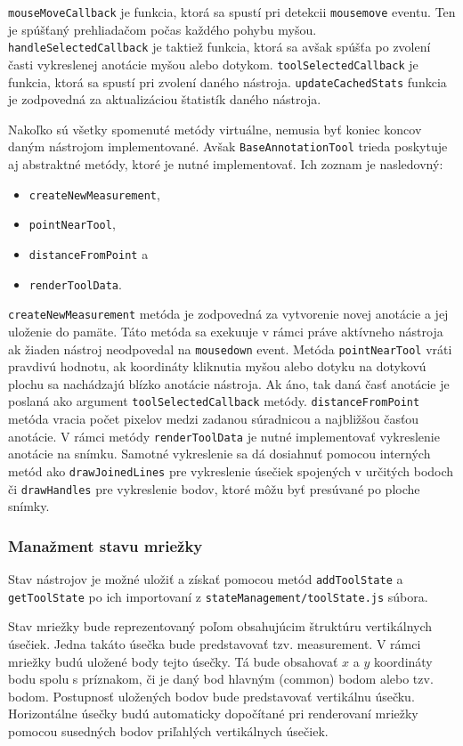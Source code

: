 \texttt{mouseMoveCallback} je funkcia, ktorá sa spustí pri detekcii \texttt{mousemove} eventu. Ten je spúšťaný prehliadačom počas každého pohybu myšou.
\texttt{handleSelectedCallback} je taktiež funkcia, ktorá sa avšak spúšťa po zvolení časti vykreslenej anotácie myšou alebo dotykom.
\texttt{toolSelectedCallback} je funkcia, ktorá sa spustí pri zvolení daného nástroja.
\texttt{updateCachedStats} funkcia je zodpovedná za aktualizáciou štatistík daného nástroja.

Nakoľko sú všetky spomenuté metódy virtuálne, nemusia byť koniec koncov daným nástrojom implementované.
Avšak \texttt{BaseAnnotationTool} trieda poskytuje aj abstraktné metódy, ktoré je nutné implementovať. Ich zoznam je nasledovný:
\begin {itemize}
\item {\texttt{createNewMeasurement},}
\item {\texttt{pointNearTool},}
\item {\texttt{distanceFromPoint} a}
\item {\texttt{renderToolData}.}
\end {itemize}

\texttt{createNewMeasurement} metóda je zodpovedná za vytvorenie novej anotácie a jej uloženie do pamäte. Táto metóda sa exekuuje v rámci práve aktívneho nástroja ak žiaden nástroj neodpovedal na \texttt{mousedown} event.
Metóda \texttt{pointNearTool} vráti pravdivú hodnotu, ak koordináty kliknutia myšou alebo dotyku na dotykovú plochu sa nachádzajú blízko anotácie nástroja. Ak áno, tak daná časť anotácie je poslaná ako argument \texttt{toolSelectedCallback} metódy.
\texttt{distanceFromPoint} metóda vracia počet pixelov medzi zadanou súradnicou a najbližšou časťou anotácie.
V rámci metódy \texttt{renderToolData} je nutné implementovať vykreslenie anotácie na snímku. Samotné vykreslenie sa dá dosiahnuť pomocou interných metód ako \texttt{drawJoinedLines} pre vykreslenie úsečiek spojených v určitých bodoch či \texttt{drawHandles} pre vykreslenie bodov, ktoré môžu byť presúvané po ploche snímky.

\subsubsection {Manažment stavu mriežky}
Stav nástrojov je možné uložiť a získať pomocou metód \texttt{addToolState} a \texttt{getToolState} po ich importovaní z \texttt{stateManagement/toolState.js} súbora.

Stav mriežky bude reprezentovaný poľom obsahujúcim štruktúru vertikálnych úsečiek. Jedna takáto úsečka bude predstavovať tzv. measurement. V rámci mriežky budú uložené body tejto úsečky. Tá bude obsahovať $x$ a $y$ koordináty bodu spolu s príznakom, či je daný bod hlavným (common) bodom alebo tzv.  bodom. 
Postupnosť uložených bodov bude predstavovať vertikálnu úsečku. Horizontálne úsečky budú automaticky dopočítané pri renderovaní mriežky pomocou susedných bodov priľahlých vertikálnych úsečiek.

